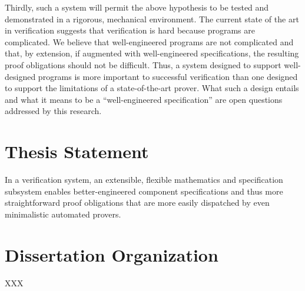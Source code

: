 Thirdly, such a system will permit the above hypothesis to be tested and demonstrated in a rigorous, mechanical environment.  The current state of the art in verification suggests that verification is hard because programs are complicated.  We believe that well-engineered programs are not complicated and that, by extension, if augmented with well-engineered specifications, the resulting proof obligations should not be difficult.  Thus, a system designed to support well-designed programs is more important to successful verification than one designed to support the limitations of a state-of-the-art prover.  What such a design entails and what it means to be a ``well-engineered specification'' are open questions addressed by this research.

\section{Thesis Statement}
In a verification system, an extensible, flexible mathematics and specification subsystem enables better-engineered component specifications and thus more straightforward proof obligations that are more easily dispatched by even minimalistic automated provers.

\section{Dissertation Organization}
XXX
